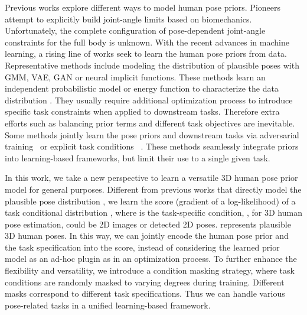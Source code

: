\documentclass[10pt,twocolumn,letterpaper]{article}
\begin{document}
Previous works explore different ways to model human pose priors. Pioneers~\cite{hatze1997three, kodek2002identifying} attempt to explicitly build joint-angle limits based on biomechanics. Unfortunately, the complete configuration of pose-dependent joint-angle constraints for the full body is unknown. 
With the recent advances in machine learning, a rising line of works seek to learn the human pose priors from data. Representative methods include modeling the distribution of plausible poses with GMM\cite{bogo2016keep}, VAE\cite{pavlakos2019expressive}, GAN\cite{davydov2022adversarial} or neural implicit functions\cite{tiwari2022pose}.
These methods learn an independent probabilistic model or energy function to characterize the data distribution . They usually require additional optimization process to introduce specific task constraints when applied to downstream tasks. Therefore extra efforts such as balancing prior terms and different task objectives are inevitable. Some methods jointly learn the pose priors and downstream tasks via adversarial training~\cite{hmrKanazawa17, kocabas2019vibe} or explicit task conditions~\cite{ling2020character, rempe2021humor, petrovich21actor} . These methods seamlessly integrate priors into learning-based frameworks, but limit their use to a single given task.

In this work, we take a new perspective to learn a versatile 3D human pose prior model for general purposes. 
Different from previous works that directly model the plausible pose distribution , we learn the score (gradient of a log-likelihood) of a task conditional distribution , where  is the task-specific condition, \eg, for 3D human pose estimation,  could be 2D images or detected 2D poses.  represents plausible 3D human poses. 
In this way, we can jointly encode the human pose prior and the task specification into the score, instead of considering the learned prior model as an ad-hoc plugin as in an optimization process. 
To further enhance the flexibility and versatility, we introduce a condition masking strategy, where task conditions are randomly masked to varying degrees during training. Different masks correspond to different task specifications. Thus we can handle various pose-related tasks in a unified learning-based framework.
\end{document}

